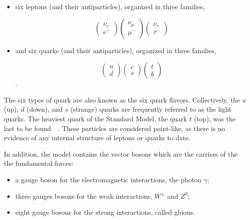 \begin{itemize}\addtolength{\itemsep}{-0.4\baselineskip}
\item
six leptons (and their antiparticles), organized in three families, 

\[ \left( \begin{array}{c} \nu_e \\ e^- \end{array} \right)  \left( \begin{array}{c} \nu_{\mu} \\ \mu^- \end{array} \right)   \left( \begin{array}{c} \nu_{\tau} \\ \tau^- \end{array} \right)     \]


\item
and six quarks (and their antiparticles), organized in three families,

\[ \left( \begin{array}{c} u \\ d \end{array} \right)  \left( \begin{array}{c} c \\ s \end{array} \right)   \left( \begin{array}{c} t \\ b \end{array} \right)     \].

\end{itemize}

The six types of quark are also known as the six quark flavors. Collectively, the $u$ (up), $d$ (down), and $s$ (strange) quarks are frequently referred to as the light quarks. The heaviest quark of the Standard Model, the quark $t$ (top), was the last to be found~\cite{PhysRevLett.74.2626}~\cite{PhysRevLett.74.2422}. These particles are considered point-like, as there is no evidence of any internal structure of leptons or quarks to date.

In addition, the model contains the vector bosons which are the carriers of the the fundamental forces:

\begin{itemize}\addtolength{\itemsep}{-0.4\baselineskip}
\item
a gauge boson for the electromagnetic interactions, the photon $\gamma$; 
\item
three gauges bosons for the weak interactions, $W^{\pm}$ and $Z^0$;
\item
eight gauge bosons for the strong interactions, called gluons. 
\end{itemize}


